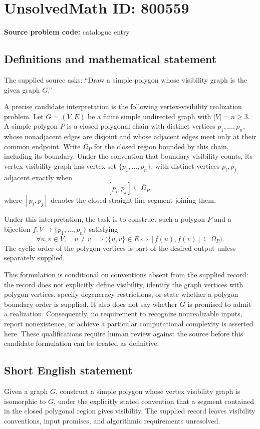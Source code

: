\documentclass[11pt]{article}
\begin{document}
\section*{UnsolvedMath ID: 800559}
\textbf{Source problem code:} catalogue entry
\subsection{Definitions and mathematical statement}
The supplied source asks: ``Draw a simple polygon whose visibility graph is the given graph $G$.''

A precise candidate interpretation is the following vertex-visibility realization problem. Let $G=(V,E)$ be a finite simple undirected graph with $|V|=n\geq 3$. A simple polygon $P$ is a closed polygonal chain with distinct vertices $p_1,\ldots,p_n$, whose nonadjacent edges are disjoint and whose adjacent edges meet only at their common endpoint. Write $\overline{\Omega}_P$ for the closed region bounded by this chain, including its boundary. Under the convention that boundary visibility counts, its vertex visibility graph has vertex set $\{p_1,\ldots,p_n\}$, with distinct vertices $p_i,p_j$ adjacent exactly when
\[
[p_i,p_j]\subseteq\overline{\Omega}_P,
\]
where $[p_i,p_j]$ denotes the closed straight line segment joining them.

Under this interpretation, the task is to construct such a polygon $P$ and a bijection $f:V\to\{p_1,\ldots,p_n\}$ satisfying
\[
\forall u,v\in V,\quad u\ne v\implies
\bigl(\{u,v\}\in E\iff[f(u),f(v)]\subseteq\overline{\Omega}_P\bigr).
\]
The cyclic order of the polygon vertices is part of the desired output unless separately supplied.

This formulation is conditional on conventions absent from the supplied record: the record does not explicitly define visibility, identify the graph vertices with polygon vertices, specify degeneracy restrictions, or state whether a polygon boundary order is supplied. It also does not say whether $G$ is promised to admit a realization. Consequently, no requirement to recognize nonrealizable inputs, report nonexistence, or achieve a particular computational complexity is asserted here. These qualifications require human review against the source before this candidate formulation can be treated as definitive.
\subsection{Short English statement}
Given a graph $G$, construct a simple polygon whose vertex visibility graph is isomorphic to $G$, under the explicitly stated convention that a segment contained in the closed polygonal region gives visibility. The supplied record leaves visibility conventions, input promises, and algorithmic requirements unresolved.
\end{document}
